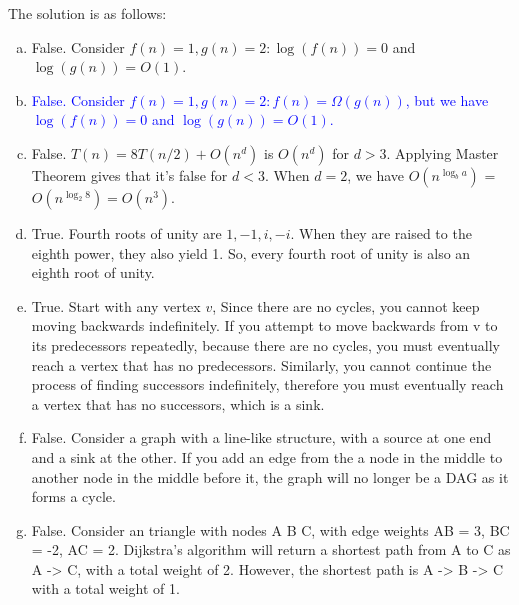 \documentclass[10pt]{article}
\begin{document}
\begin{solution}
    The solution is as follows:
    \begin{enumerate} [(a)]
        \item False. Consider $f(n) = 1, g(n) = 2: \log(f(n)) = 0$ and $\log(g(n)) = O(1)$.
        \item \textcolor{blue}{False. Consider $f(n) = 1, g(n) = 2: f(n) = \Omega(g(n))$, but we have $\log(f(n)) = 0$ and $\log(g(n)) = O(1)$.}
        \item False. $T(n) = 8T(n/2) + O(n^d)$ is $O(n^d)$ for $d > 3$. Applying Master Theorem gives that it's false for $d < 3$. When $d = 2$, we have $O(n^{\log_b a})$ = $O(n^{\log_2 8}) = O(n^3)$.
        \item True. Fourth roots of unity are $1, -1, i, -i$. When they are raised to the eighth power, they also yield 1. So, every fourth root of unity is also an eighth root of unity.
        \item True. Start with any vertex $v$, Since there are no cycles, you cannot keep moving backwards indefinitely. If you attempt to move backwards from 
        v to its predecessors repeatedly, because there are no cycles, you must eventually reach a vertex that has no predecessors. Similarly, you cannot continue the process of finding successors indefinitely, therefore you must eventually reach a vertex that has no successors, which is a sink.
        \item False. Consider a graph with a line-like structure, with a source at one end and a sink at the other. If you add an edge from the a node in the middle to another node in the middle before it, the graph will no longer be a DAG as it forms a cycle.
        \item False. Consider an triangle with nodes A B C, with edge weights AB = 3, BC = -2, AC = 2. Dijkstra's algorithm will return a shortest path from A to C as A -> C, with a total weight of 2. However, the shortest path is A -> B -> C with a total weight of 1.
    \end{enumerate}   
\end{solution}

\end{document}

